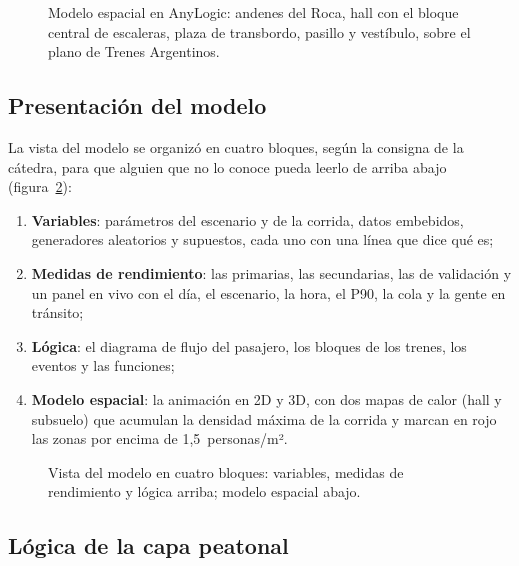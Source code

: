 \begin{figure}[H]
\centering
{}
\caption{Modelo espacial en AnyLogic: andenes del Roca, hall con el bloque central de escaleras, plaza de
transbordo, pasillo y vestíbulo, sobre el plano de Trenes Argentinos.}
\label{fig:plano}
\end{figure}

\subsection{Presentación del modelo}
\label{anx:presentacion}

La vista del modelo se organizó en cuatro bloques, según la consigna de la cátedra, para que alguien que no lo
conoce pueda leerlo de arriba abajo (figura~\ref{fig:bloques}):
\begin{enumerate}
  \item \textbf{Variables}: parámetros del escenario y de la corrida, datos embebidos, generadores aleatorios
        y supuestos, cada uno con una línea que dice qué es;
  \item \textbf{Medidas de rendimiento}: las primarias, las secundarias, las de validación y un panel en vivo
        con el día, el escenario, la hora, el P90, la cola y la gente en tránsito;
  \item \textbf{Lógica}: el diagrama de flujo del pasajero, los bloques de los trenes, los eventos y las
        funciones;
  \item \textbf{Modelo espacial}: la animación en 2D y 3D, con dos mapas de calor (hall y subsuelo) que
        acumulan la densidad máxima de la corrida y marcan en rojo las zonas por encima de
        1,5~personas/m².
\end{enumerate}

\begin{figure}[H]
\centering
{}
\caption{Vista del modelo en cuatro bloques: variables, medidas de rendimiento y lógica arriba; modelo espacial
abajo.}
\label{fig:bloques}
\end{figure}

\subsection{Lógica de la capa peatonal}
\label{anx:logica}

